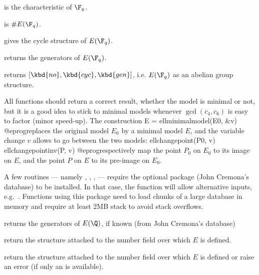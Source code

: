 
\item {} is the characteristic of $\F_q$.

\item {} is $\#E(\F_q)$.

\item {} gives the cycle structure of $E(\F_q)$.

\item {} returns the generators of $E(\F_q)$.

\item {} returns $[\kbd{no},\kbd{cyc},\kbd{gen}]$, i.e. $E(\F_q)$
as an abelian group structure.


All functions should return a correct result, whether the model is minimal or
not, but it is a good idea to stick to minimal models whenever
$\gcd(c_4,c_6)$ is easy to factor (minor speed-up). The construction
\bprog
  E = ellminimalmodel(E0, &v)
@eprog\noindent replaces the original model $E_0$ by a minimal model $E$,
and the variable change $v$ allows to go between the two models:
\bprog
  ellchangepoint(P0, v)
  ellchangepointinv(P, v)
@eprog\noindent respectively map the point $P_0$ on $E_0$ to its image on
$E$, and the point $P$ on $E$ to its pre-image on $E_0$.

A few routines --- namely , ,
,  --- require the optional package 
(John Cremona's database) to be installed. In that case, the function
 will allow alternative inputs, e.g.~.
Functions using this package need to load chunks of a large database in
memory and require at least 2MB stack to avoid stack overflows.

\item {} returns the generators of $E(\Q)$, if known (from John
  Cremona's database)


\item {} return the  structure attached to the number field
over which $E$ is defined.

\item {} return the  structure attached to the number field
over which $E$ is defined or raise an error (if only an  is available).

